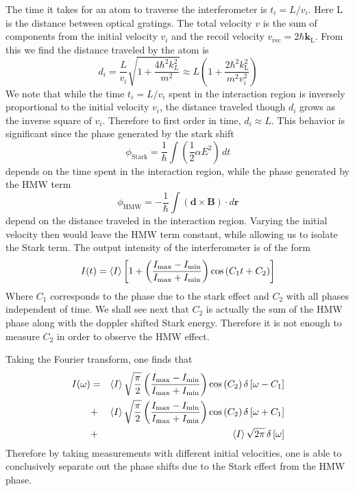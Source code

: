 \documentclass[twocolumn,english,pra,aps,superscriptaddress,floatfix]{revtex4-1}
\begin{document}
The time it takes for an atom to traverse the interferometer is $t_i=L/v_i$.  Here L is the distance between optical gratings.  The total velocity $v$ is the sum of components from the initial velocity $v_i$ and the recoil velocity $v_{\mathrm{rec}}=2\hbar \mathbf{k}_{\mathrm{L}}$.  From this we find the distance traveled by the atom is
\begin{equation}
d_i=\frac{L}{v_i}\sqrt{1+\frac{4\hbar^2k_L^2}{m^2}}\approx L\left(1+\frac{2\hbar^2k_{\mathrm{L}}^2}{m^2 v_i^2}\right)
\end{equation}
We note that while the time $t_i=L/v_i$ spent in the interaction region is inversely proportional to the initial velocity $v_i$, the distance traveled though $d_i$ grows as the inverse square of $v_i$. Therefore to first order in time, $d_i\approx L$. 
This behavior is significant since the phase generated by the stark shift
\begin{equation}
\phi_{\mathrm{Stark}}=\frac{1}{\hbar}\int\left(\frac{1}{2}\alpha E^2\right)\, dt
\end{equation}
depends on the time spent in the interaction region, while the phase generated by the HMW term
\begin{equation}
\phi_{\mathrm{HMW}}=-\frac{1}{\hbar}\int\left(\mathbf{d}\times\mathbf{B}\right)\cdot d\mathbf{r}
\end{equation}
depend on the distance traveled in the interaction region.  Varying the initial velocity then would leave the HMW term constant, while allowing us to isolate the Stark term.
The output intensity of the interferometer is of the form
\begin{equation}
I(t)=\braket{I}\left[1+\left(\frac{I_{\mathrm{max}}-I_{\mathrm{min}}}{I_{\mathrm{max}}+I_{\mathrm{min}}}\right)\cos\left(C_1t+C_2\right)\right]
\end{equation}
Where $C_1$ corresponds to the phase due to the stark effect and $C_2$ with all phases independent of time.  We shall see next that $C_2$ is actually the sum of the HMW phase along with the doppler shifted Stark energy.  Therefore it is not enough to measure $C_2$ in order to observe the HMW effect.    

Taking the Fourier transform, one finds that  
\begin{eqnarray}
I(\omega)&=&\braket{I}\sqrt{\frac{\pi}{2}}\left(\frac{I_{\mathrm{max}}-I_{\mathrm{min}}}{I_{\mathrm{max}}+I_{\mathrm{min}}}\right)\cos\left(C_2\right)\delta\left[\omega-C_1\right] \nonumber \\
&+&\braket{I}\sqrt{\frac{\pi}{2}}\left(\frac{I_{\mathrm{max}}-I_{\mathrm{min}}}{I_{\mathrm{max}}+I_{\mathrm{min}}}\right)\cos\left(C_2\right)\delta\left[\omega+C_1\right] \nonumber \\
&+&\braket{I}\sqrt{2\pi}\,\delta\left[\omega\right]
\label{intensity}
\end{eqnarray}
Therefore by taking measurements with different initial velocities, one is able to conclusively separate out the phase shifts due to the Stark effect from the HMW phase.
\end{document}
